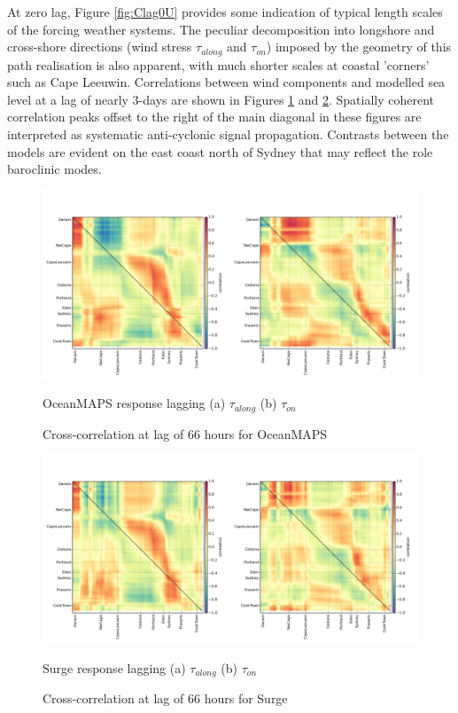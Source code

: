 At zero lag, Figure \ref{fig:Clag0U} provides some indication of typical length scales of the forcing weather systems.  
The peculiar decomposition into longshore and cross-shore directions (wind stress $\tau_{along}$ and $\tau_{on}$) imposed by the geometry of this path realisation is also apparent, with much shorter scales at coastal 'corners' such as Cape Leeuwin.  
Correlations between wind components and modelled sea level at a lag of nearly 3-days are shown in Figures \ref{fig:Clag66sla} and \ref{fig:Clag66surge}.  
Spatially coherent correlation peaks offset to the right of the main diagonal in these figures are interpreted as systematic anti-cyclonic signal propagation. 
Contrasts between the models are evident on the east coast north of Sydney that may reflect the role baroclinic modes.
\newcommand\CAPTIONb{Cross-correlation at lag of 66 hours}
\begin{figure}[!hbt] \centering
    \includegraphics[width=\figwidthFull]{figures/plots/concatC_sla_lag_066.png}
    \caption{\CAPTIONb{} for OceanMAPS}
    {OceanMAPS response lagging (a) $\tau_{along}$ (b) $\tau_{on}$} 
    \label{fig:Clag66sla}
\end{figure}

\begin{figure}[!hbt] \centering
    \includegraphics[width=\figwidthFull]{figures/plots/concatC_surgeg_lag_066.png}
    \caption{\CAPTIONb{} for Surge}
    {Surge response lagging (a) $\tau_{along}$ (b) $\tau_{on}$} 
    \label{fig:Clag66surge}
\end{figure}


